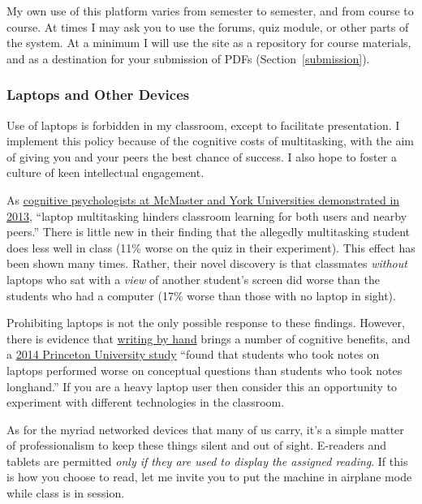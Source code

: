 My own use of this platform varies from semester to semester, and from
course to course. At times I may ask you to use the forums, quiz module, or
other parts of the system. At a minimum I will use the site as a repository
for course materials, and as a destination for your submission of PDFs
(Section~\ref{submission}).

\subsubsection{Laptops and Other Devices}
\label{laptops}

Use of laptops is forbidden in my classroom, except to facilitate presentation.
I implement this policy because of the cognitive costs of multitasking, with the
aim of giving you and your peers the best chance of success. I also hope to
foster a culture of keen intellectual engagement.

As \href{http://dx.doi.org/10.1016/j.compedu.2012.10.003}{cognitive
psychologists at McMaster and York Universities demonstrated in 2013}, ``laptop
multitasking hinders classroom learning for both users and nearby peers.'' There
is little new in their finding that the allegedly multitasking student does less
well in class (11\% worse on the quiz in their experiment). This effect has been
shown many times. Rather, their novel discovery is that classmates
\emph{without} laptops who sat with a \emph{view} of another student's screen
did worse than the students who had a computer (17\% worse than those with no
laptop in sight).

Prohibiting laptops is not the only possible response to these findings.
However, there is evidence that \href{http://on.wsj.com/pjtJaK}{writing by hand}
brings a number of cognitive benefits, and a
\href{http://dx.doi.org/10.1177/0956797614524581}{2014 Princeton University
study} ``found that students who took notes on laptops performed worse on
conceptual questions than students who took notes longhand.'' If you are a heavy
laptop user then consider this an opportunity to experiment with different
technologies in the classroom.

As for the myriad networked devices that many of us carry, it's a simple matter
of professionalism to keep these things silent and out of sight. E-readers and
tablets are permitted \emph{only if they are used to display the assigned
reading}. If this is how you choose to read, let me invite you to put the
machine in airplane mode while class is in session.

